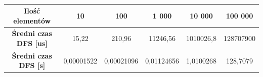 \documentclass[11pt,a4paper]{article}
\begin{document}
\begin{table}[htbp]
\caption{}
\begin{center}
\begin{tabular}{|c|c|c|c|c|c|}
\hline
\textbf{Ilość elementów} & \textbf{10} & \textbf{100} & \textbf{1 000} & \textbf{10 000} & \textbf{100 000} \\ \hline
\textbf{Średni czas DFS [us]} & 15,22 & 210,96 & 11246,56 & 1010026,8 & 128707900 \\ \hline
\textbf{Średni czas DFS [s]} & 0,00001522 & 0,00021096 & 0,01124656 & 1,0100268 & 128,7079 \\ \hline
\end{tabular}
\end{center}
\label{dfs_sredni}
\end{table}
\end{document}
